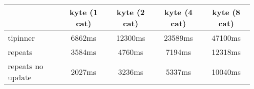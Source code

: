 \begin{tabular}{|l|c|c|c|c|}
\hline
 & kyte (1 cat) & kyte (2 cat) & kyte (4 cat) & kyte (8 cat)\\
\hline
tipinner &  6862ms &  12300ms &  23589ms &  47100ms\\
\hline
repeats &  3584ms &  4760ms &  7194ms &  12318ms\\
\hline
repeats no update &  2027ms &  3236ms &  5337ms &  10040ms\\
\hline
\end{tabular}
